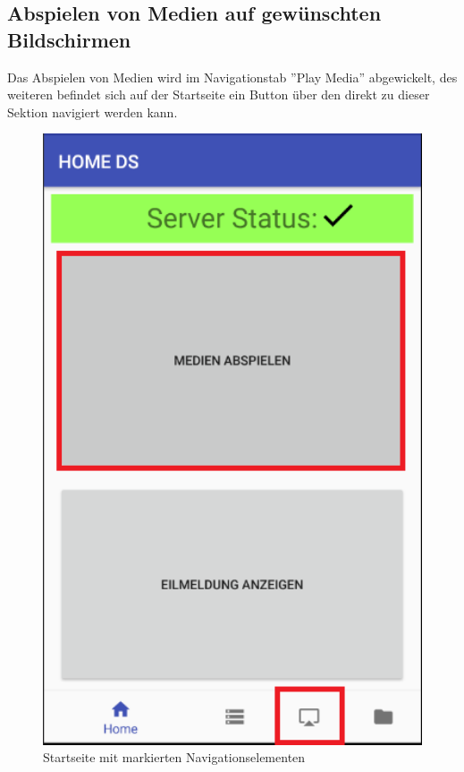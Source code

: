 \subsection{Abspielen von Medien auf gewünschten Bildschirmen}
Das Abspielen von Medien wird im Navigationstab ''Play Media'' abgewickelt, des weiteren befindet sich auf der Startseite ein Button über den direkt zu dieser Sektion navigiert werden kann.
\\
\begin{figure}[H]
\centering
\includegraphics[width=1.0\textwidth]{images/06_AndroidApp/06_mediaNavigation}
\caption{Startseite mit markierten Navigationselementen}
\label{fig:mediaNav}
\end{figure}
